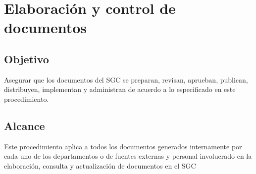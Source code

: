 \thispagestyle{formato-PI}

\renewcommand{\Elaboro}{XXXX}
\renewcommand{\Reviso}{YYYY}
\renewcommand{\Autorizo}{ZZZZ}
\renewcommand{\MayorVer}{3}             %
\renewcommand{\MenorVer}{0}             %
\renewcommand{\Codigo}{PRO-AC-101}      %
\renewcommand{\FechaPub}{2023--01}      %
\renewcommand{\Titulo}{Elaboración y control de documentos} %

\section{\Titulo}   %

\subsection{Objetivo}
Asegurar que los \glspl{documento} del \gls{SGC} se preparan, revisan, aprueban, publican, distribuyen, implementan y administran de acuerdo a lo especificado en este procedimiento.

\subsection{Alcance}
Este procedimiento aplica a todos los documentos generados internamente por cada uno de los departamentos o de fuentes externas y personal involucrado en la elaboración, consulta y actualización de documentos en el \gls{SGC}

